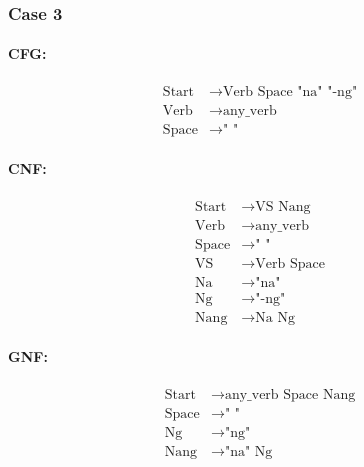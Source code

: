 \subsubsection{Case 3}

\paragraph{CFG:}

\begin{equation*}
    \begin{aligned}
        \text{Start} & \rightarrow \text{Verb Space "na" "-ng"} \\
        \text{Verb}  & \rightarrow \text{any\_verb}             \\
        \text{Space} & \rightarrow \text{" "}
    \end{aligned}
\end{equation*}

\paragraph{CNF:}

\begin{equation*}
    \begin{aligned}
        \text{Start} & \rightarrow \text{VS Nang}    \\
        \text{Verb}  & \rightarrow \text{any\_verb}  \\
        \text{Space} & \rightarrow \text{" "}        \\
        \text{VS}    & \rightarrow \text{Verb Space} \\
        \text{Na}    & \rightarrow \text{"na"}       \\
        \text{Ng}    & \rightarrow \text{"-ng"}      \\
        \text{Nang}  & \rightarrow \text{Na Ng}
    \end{aligned}
\end{equation*}

\paragraph{GNF:}

\begin{equation*}
    \begin{aligned}
        \text{Start} & \rightarrow \text{any\_verb Space Nang} \\
        \text{Space} & \rightarrow \text{" "}                  \\
        \text{Ng}    & \rightarrow \text{"ng"}                 \\
        \text{Nang}  & \rightarrow \text{"na" Ng}
    \end{aligned}
\end{equation*}



